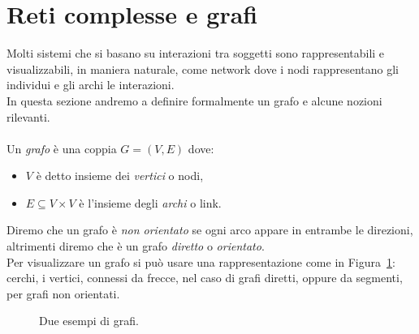 \section{Reti complesse e grafi}
Molti sistemi che si basano su interazioni tra soggetti sono rappresentabili e visualizzabili, in maniera naturale, come network dove i nodi rappresentano gli individui e gli archi le interazioni.\\
In questa sezione andremo a definire formalmente un grafo e alcune nozioni rilevanti.\\ \\
Un \textit{grafo} \`e una coppia $G=(V,	E) $ dove:
\begin{itemize}
	\item $V$ \`e detto  insieme dei \textit{vertici} o nodi,
	\item $E\subseteq V \times V$ \`e l'insieme degli \textit{archi} o link.
\end{itemize}
Diremo che un grafo \`e \textit{non orientato} se ogni arco appare in entrambe le direzioni, altrimenti diremo che \`e un grafo \textit{diretto} o \textit{orientato}.\\
Per visualizzare un grafo si pu\`o usare una rappresentazione come in Figura~\ref{fig::esegrafi}: cerchi, i vertici, connessi da frecce, nel caso di grafi diretti, oppure da segmenti, per grafi non orientati. 
\begin{figure}[h]
\centering
{}  \hfill
{}
\caption{Due esempi di grafi.}
\label{fig::esegrafi}
\end{figure}

